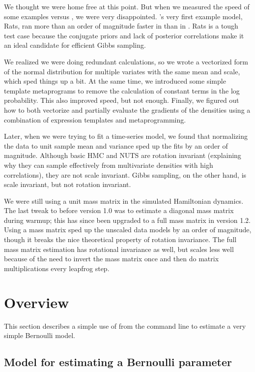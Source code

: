 \documentclass[article]{jss}
\begin{document}
We thought we were home free at this point.  But when we measured the
speed of some  examples versus , we were
very disappointed.  's very first example model, Rats,
ran more than an order of magnitude faster in  than in
.  Rats is a tough test case because the conjugate
priors and lack of posterior correlations make it an ideal candidate
for efficient Gibbs sampling.  

We realized we were doing redundant calculations, so we wrote a
vectorized form of the normal distribution for multiple variates with
the same mean and scale, which sped things up a bit. At the same time,
we introduced some simple template metaprograms to remove the
calculation of constant terms in the log probability.  This also
improved speed, but not enough.  Finally, we figured out how to both
vectorize and partially evaluate the gradients of the densities using
a combination of expression templates and metaprogramming. 

Later, when we were trying to fit a time-series model, we found that
normalizing the data to unit sample mean and variance sped up the fits
by an order of magnitude.  Although basic HMC and NUTS are rotation
invariant (explaining why they can sample effectively from
multivariate densities with high correlations), they are not scale
invariant.  Gibbs sampling, on the other hand, is scale invariant, but
not rotation invariant.

We were still using a unit mass matrix in the simulated Hamiltonian
dynamics.  The last tweak to  before version 1.0 was to estimate
a diagonal mass matrix during warmup; this has since been upgraded to
a full mass matrix in  version 1.2.  Using a mass
matrix sped up the unscaled data models by an order of magnitude,
though it breaks the nice theoretical property of rotation invariance.
The full mass matrix estimation has rotational invariance as well, but
scales less well because of the need to invert the mass matrix once
and then do matrix multiplications every leapfrog step.

\section{Overview}

This section describes a simple use of  from the
command line to estimate a very simple Bernoulli model.

\subsection{Model for estimating a Bernoulli parameter}
\end{document}
